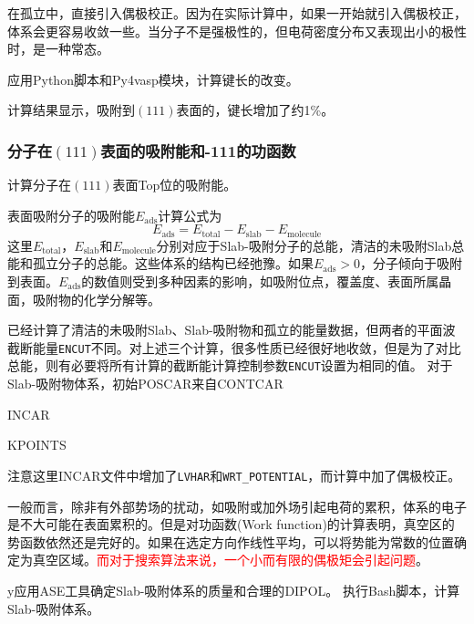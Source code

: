 在孤立中，直接引入偶极校正。因为在实际计算中，如果一开始就引入偶极校正，体系会更容易收敛一些。当分子不是强极性的，但电荷密度分布又表现出小的极性时，是一种常态。

应用\textrm{Python}脚本和\textrm{Py4vasp}模块，计算键长的改变。

计算结果显示，吸附到$(111)$表面的，键长增加了约1\%。

\subsubsection{分子在$(111)$表面的吸附能和-111的功函数}

计算分子在$(111)$表面\textrm{Top}位的吸附能。

表面吸附分子的吸附能$E_{\mathrm{ads}}$计算公式为
\begin{displaymath}
	E_{\mathrm{ads}}=E_{\mathrm{total}}-E_{\mathrm{slab}}-E_{\mathrm{molecule}}
\end{displaymath}
这里$E_{\mathrm{total}}$，$E_{\mathrm{slab}}$和$E_{\mathrm{molecule}}$分别对应于\textrm{Slab}-吸附分子的总能，清洁的未吸附\textrm{Slab}总能和孤立分子的总能。这些体系的结构已经弛豫。如果$E_{\mathrm{ads}}>0$，分子倾向于吸附到表面。$E_{\mathrm{ads}}$的数值则受到多种因素的影响，如吸附位点，覆盖度、表面所属晶面，吸附物的化学分解等。

已经计算了清洁的未吸附\textrm{Slab}、\textrm{Slab}-吸附物和孤立的能量数据，但两者的平面波截断能量\texttt{ENCUT}不同。对上述三个计算，很多性质已经很好地收敛，但是为了对比总能，则有必要将所有计算的截断能计算控制参数\texttt{ENCUT}设置为相同的值。%
对于\textrm{Slab}-吸附物体系，初始\textrm{POSCAR}来自\textrm{CONTCAR}

\textrm{INCAR}

\textrm{KPOINTS}

注意这里\textrm{INCAR}文件中增加了\texttt{LVHAR}和\texttt{WRT\_POTENTIAL}，而计算中加了偶极校正。

一般而言，除非有外部势场的扰动，如吸附或加外场引起电荷的累积，体系的电子是不大可能在表面累积的。但是对功函数\textrm{(Work function)}的计算表明，真空区的势函数依然还是完好的。如果在选定方向作线性平均，可以将势能为常数的位置确定为真空区域。\textcolor{red}{而对于搜索算法来说，一个小而有限的偶极矩会引起问题}。

y应用\textrm{ASE}工具确定\textrm{Slab}-吸附体系的质量和合理的\textrm{DIPOL}。
执行\textrm{Bash}脚本，计算\textrm{Slab}-吸附体系。

